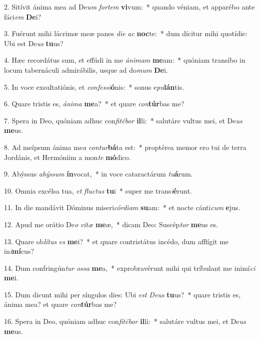 2. Sitívit ánima mea ad De\textit{um} \textit{for}\textit{tem} \textbf{vi}vum:~*  quando véniam, et apparébo ante fáci\textit{em} \textbf{De}i?\

3. Fuérunt mihi lácrimæ meæ panes \textit{di}\textit{e} \textit{ac} \textbf{noc}te:~*  dum dícitur mihi quotídie: Ubi est De\textit{us} \textbf{tu}us?\

4. Hæc recordátus sum, et effúdi in me \textit{á}\textit{ni}\textit{mam} \textbf{me}am:~*  quóniam transíbo in locum tabernáculi admirábilis, usque ad do\textit{mum} \textbf{De}i.\

5. In voce exsultatiónis, et \textit{con}\textit{fes}\textit{si}\textbf{ó}nis:~*  sonus e\textit{pu}\textbf{lán}tis.\

6. Quare tristis es, \textit{á}\textit{ni}\textit{ma} \textbf{me}a?~*  et quare \textit{con}\textbf{túr}bas me?\

7. Spera in Deo, quóniam adhuc con\textit{fi}\textit{té}\textit{bor} \textbf{il}li:~*  salutáre vultus mei, et De\textit{us} \textbf{me}us.\

8. Ad meípsum ánima me\textit{a} \textit{con}\textit{tur}\textbf{bá}ta est:~*  proptérea memor ero tui de terra Jordánis, et Hermóniim a mon\textit{te} \textbf{mó}dico.\

9. Abýssus \textit{a}\textit{býs}\textit{sum} \textbf{ín}vocat,~*  in voce cataractárum \textit{tu}\textbf{á}rum.\

10. Omnia excélsa tua, \textit{et} \textit{fluc}\textit{tus} \textbf{tu}i~*  super me trans\textit{i}\textbf{é}runt.\

11. In die mandávit Dóminus miseri\textit{cór}\textit{di}\textit{am} \textbf{su}am:~*  et nocte cánti\textit{cum} \textbf{e}jus.\

12. Apud me orátio De\textit{o} \textit{vi}\textit{tæ} \textbf{me}æ,~*  dicam Deo: Suscép\textit{tor} \textbf{me}us es.\

13. Quare ob\textit{lí}\textit{tus} \textit{es} \textbf{me}i?~*  et quare contristátus incédo, dum afflígit me in\textit{i}\textbf{mí}cus?\

14. Dum confringún\textit{tur} \textit{os}\textit{sa} \textbf{me}a,~*  exprobravérunt mihi qui tríbulant me inimí\textit{ci} \textbf{me}i.\

15. Dum dicunt mihi per síngulos dies: Ubi \textit{est} \textit{De}\textit{us} \textbf{tu}us?~*  quare tristis es, ánima mea? et quare \textit{con}\textbf{túr}bas me?\

16. Spera in Deo, quóniam adhuc con\textit{fi}\textit{té}\textit{bor} \textbf{il}li:~*  salutáre vultus mei, et De\textit{us} \textbf{me}us.\

